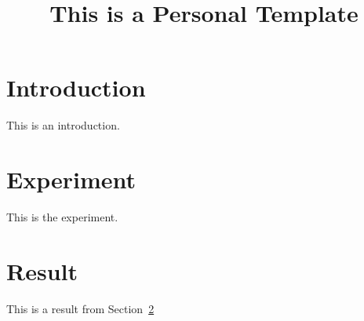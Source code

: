 \documentclass{article}
\begin{document}
\title{This is a Personal \LaTeXe{} Template}
\maketitle

\section{Introduction}
\label{sec:intr}
This is an introduction.
\section{Experiment}
\label{sec:exp}
This is the experiment.
\section{Result}
\label{sec:result}
This is a result from Section~\ref{sec:exp}
\end{document}
